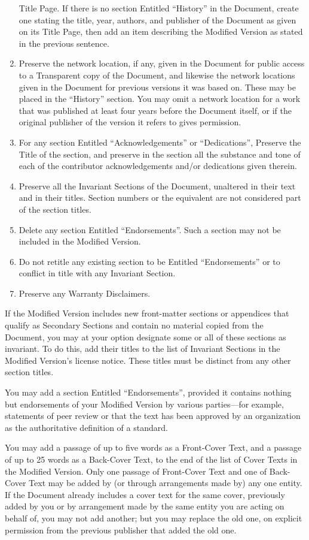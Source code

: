 \begin{enumerate}
       Title Page. If there is no section Entitled ``History'' in the Document, create one stating
       the title, year, authors, and publisher of the Document as given on its Title Page, then
       add an item describing the Modified Version as stated in the previous sentence.
 \item Preserve the network location, if any, given in the Document for public access to a
       Transparent copy of the Document, and likewise the network locations given in the Document
       for previous versions it was based on. These may be placed in the ``History'' section. You
       may omit a network location for a work that was published at least four years before the
       Document itself, or if the original publisher of the version it refers to gives permission.
 \item For any section Entitled ``Acknowledgements'' or ``Dedications'', Preserve the Title of the
       section, and preserve in the section all the substance and tone of each of the contributor
       acknowledgements and/or dedications given therein.
 \item Preserve all the Invariant Sections of the Document, unaltered in their text and in their
       titles. Section numbers or the equivalent are not considered part of the section titles.
 \item Delete any section Entitled ``Endorsements''. Such a section may not be included in the
       Modified Version.
 \item Do not retitle any existing section to be Entitled ``Endorsements'' or to conflict in title
       with any Invariant Section.
 \item Preserve any Warranty Disclaimers.
\end{enumerate}
\endgroup
If the Modified Version includes new front-matter sections or appendices that qualify as
Secondary Sections and contain no material copied from the Document, you may at your option
designate some or all of these sections as invariant. To do this, add their titles to the list of
Invariant Sections in the Modified Version's license notice. These titles must be distinct from
any other section titles.

You may add a section Entitled ``Endorsements'', provided it contains nothing but endorsements
of your Modified Version by various parties---for example, statements of peer review or
that the text has been approved by an organization as the authoritative definition of a standard.

You may add a passage of up to five words as a Front-Cover Text, and a passage of up to
25 words as a Back-Cover Text, to the end of the list of Cover Texts in the Modified Version.
Only one passage of Front-Cover Text and one of Back-Cover Text may be added by (or through
arrangements made by) any one entity. If the Document already includes a cover text for the
same cover, previously added by you or by arrangement made by the same entity you are acting
on behalf of, you may not add another; but you may replace the old one, on explicit permission
from the previous publisher that added the old one.

